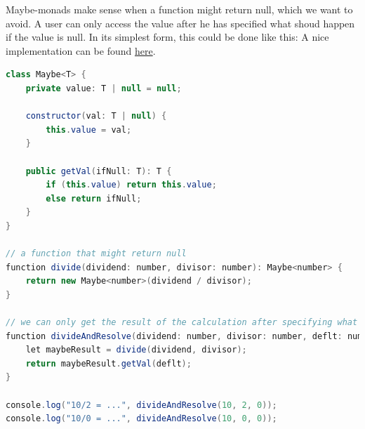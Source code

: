 Maybe-monads make sense when a function might return null, which we want to avoid. A user can only access the value after he has specified what shoud happen if the value is null. In its simplest form, this could be done like this: 
A nice implementation can be found \href{https://codewithstyle.info/advanced-functional-programming-in-typescript-maybe-monad/}{here}.

\begin{lstlisting}[language=java]
class Maybe<T> { 
    private value: T | null = null;

    constructor(val: T | null) {
        this.value = val;
    }

    public getVal(ifNull: T): T { 
        if (this.value) return this.value;
        else return ifNull;
    }
}

// a function that might return null
function divide(dividend: number, divisor: number): Maybe<number> { 
    return new Maybe<number>(dividend / divisor);
}

// we can only get the result of the calculation after specifying what should happen if null is returned. 
function divideAndResolve(dividend: number, divisor: number, deflt: number): number { 
    let maybeResult = divide(dividend, divisor);
    return maybeResult.getVal(deflt);
}

console.log("10/2 = ...", divideAndResolve(10, 2, 0));
console.log("10/0 = ...", divideAndResolve(10, 0, 0));
\end{lstlisting}